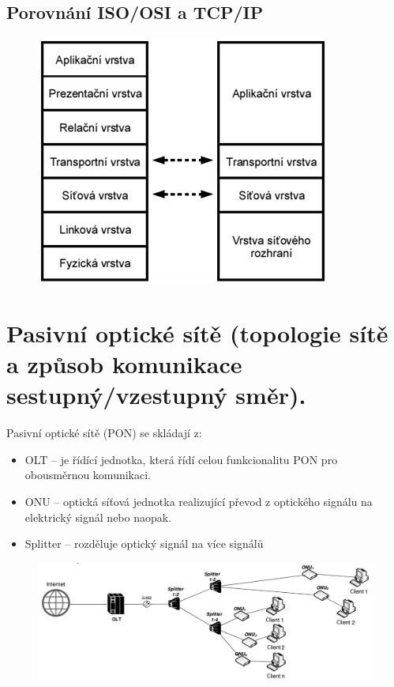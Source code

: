 \subsection{Porovnání ISO/OSI a TCP/IP}
\begin{figure} [h]
    \centering
    \includegraphics[scale=0.85]{snimky/Vrstvy2.jpg}
\end{figure}

\clearpage
\section{Pasivní optické sítě (topologie sítě a způsob komunikace sestupný/vzestupný směr).}
Pasivní optické sítě (PON) se skládají z:
\begin{itemize}
    \item OLT -- je řídící jednotka, která řídí celou funkcionalitu PON pro obousměrnou komunikaci.
    \item ONU -- optická síťová jednotka realizující převod z optického signálu na elektrický signál nebo naopak.
    \item Splitter -- rozděluje optický signál na více signálů
\end{itemize}
\begin{figure} [h]
    \centering
    \includegraphics[width=\textwidth]{snimky/PONTopologie.png}
    \label{fig:pon}
\end{figure}

